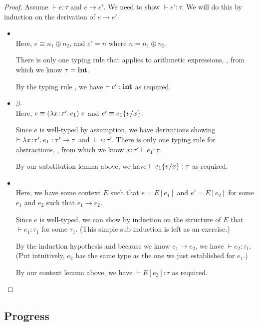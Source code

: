 
\begin{proof}
Assume $\vdash e : \tau$ and $e \to e'$. We need to show $\vdash e' : \tau$. We will do this by induction on the derivation of $e \to e'$.
\begin{itemize}
\item {}\\
Here, $e \equiv n_1 \oplus n_2$, and $e' = n$ where $n = n_1 \oplus n_2$.

There is only one typing rule that applies to arithmetic expressions, , from which we know $\tau = \mathbf{int}$.

By the typing rule , we have $\vdash e' : \mathbf{int}$ as required.

\item $\beta$-\\
Here, $e \equiv (\lambda x\!:\!\tau'.\, e_1)\; v$ and $e' \equiv e_1\{v/x\}$.

Since $e$ is well-typed by assumption, we have derivations showing $\vdash \lambda x\!:\!\tau'.\, e_1 : \tau' \to \tau$ and $\vdash v : \tau'$. There is only one typing rule for abstractions, , from which we know $x:\tau' \vdash e_1 : \tau$.

By our substitution lemma above, we have $\vdash e_1\{v/x\} : \tau$ as required.

\item {}\\
Here, we have some context $E$ such that $e = E[e_1]$ and $e' = E[e_2]$ for some $e_1$ and $e_2$ such that $e_1 \to e_2$.

Since $e$ is well-typed, we can show by induction on the structure of $E$ that $\vdash e_1 : \tau_1$ for some $\tau_1$. (This simple sub-induction is left as an exercise.)

By the induction hypothesis and because we know $e_1 \to e_2$, we have $\vdash e_2 : \tau_1$. (Put intuitively, $e_2$ has the same type as the one we just established for $e_1$.)

By our context lemma above, we have $\vdash E[e_2] : \tau$ as required.
\end{itemize}
\end{proof}

\subsection{Progress}

